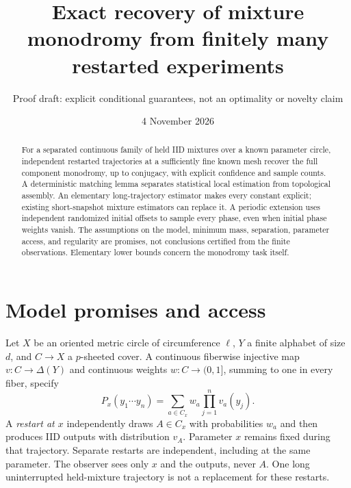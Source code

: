 \documentclass[11pt]{article}
\title{Exact recovery of mixture monodromy from finitely many restarted experiments}
\author{Proof draft: explicit conditional guarantees, not an optimality or novelty claim}
\date{4 November 2026}
\theoremstyle{remark}\newtheorem{remark}[theorem]{Remark}
\begin{document}
\maketitle

\begin{abstract}
For a separated continuous family of held IID mixtures over a known parameter circle, independent restarted trajectories at a sufficiently fine known mesh recover the full component monodromy, up to conjugacy, with explicit confidence and sample counts. A deterministic matching lemma separates statistical local estimation from topological assembly. An elementary long-trajectory estimator makes every constant explicit; existing short-snapshot mixture estimators can replace it. A periodic extension uses independent randomized initial offsets to sample every phase, even when initial phase weights vanish. The assumptions on the model, minimum mass, separation, parameter access, and regularity are promises, not conclusions certified from the finite observations. Elementary lower bounds concern the monodromy task itself.
\end{abstract}

\section{Model promises and access}
Let $X$ be an oriented metric circle of circumference $\ell$, $Y$ a finite alphabet of size $d$, and $C\to X$ a $p$-sheeted cover. A continuous fiberwise injective map $v:C\to\Delta(Y)$ and continuous weights $w:C\to(0,1]$, summing to one in every fiber, specify
\[
 P_x(y_1\cdots y_n)=\sum_{a\in C_x}w_a\prod_{j=1}^n v_a(y_j).
\]
A \emph{restart at $x$} independently draws $A\in C_x$ with probabilities $w_a$ and then produces IID outputs with distribution $v_A$. Parameter $x$ remains fixed during that trajectory. Separate restarts are independent, including at the same parameter. The observer sees only $x$ and the outputs, never $A$. One long uninterrupted held-mixture trajectory is not a replacement for these restarts.
\end{document}
